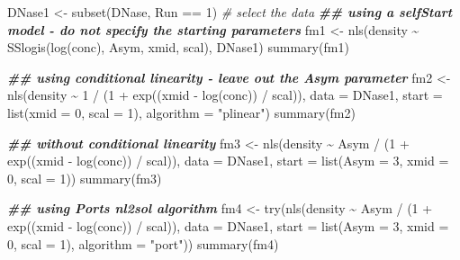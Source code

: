 \documentclass[
]{article}
\newenvironment{Shaded}{\begin{snugshade}}{\end{snugshade}}
\newcommand{\AttributeTok}[1]{\textcolor[rgb]{0.77,0.63,0.00}{#1}}
\newcommand{\CommentTok}[1]{\textcolor[rgb]{0.56,0.35,0.01}{\textit{#1}}}
\newcommand{\DecValTok}[1]{\textcolor[rgb]{0.00,0.00,0.81}{#1}}
\newcommand{\DocumentationTok}[1]{\textcolor[rgb]{0.56,0.35,0.01}{\textbf{\textit{#1}}}}
\newcommand{\FunctionTok}[1]{\textcolor[rgb]{0.00,0.00,0.00}{#1}}
\newcommand{\NormalTok}[1]{#1}
\newcommand{\OtherTok}[1]{\textcolor[rgb]{0.56,0.35,0.01}{#1}}
\newcommand{\SpecialCharTok}[1]{\textcolor[rgb]{0.00,0.00,0.00}{#1}}
\newcommand{\StringTok}[1]{\textcolor[rgb]{0.31,0.60,0.02}{#1}}
\begin{document}
\begin{Shaded}
\begin{Highlighting}[]
\NormalTok{DNase1 }\OtherTok{\textless{}{-}} \FunctionTok{subset}\NormalTok{(DNase, Run }\SpecialCharTok{==} \DecValTok{1}\NormalTok{) }\CommentTok{\# select the data}
\DocumentationTok{\#\# using a selfStart model {-} do not specify the starting parameters}
\NormalTok{fm1 }\OtherTok{\textless{}{-}} \FunctionTok{nls}\NormalTok{(density }\SpecialCharTok{\textasciitilde{}} \FunctionTok{SSlogis}\NormalTok{(}\FunctionTok{log}\NormalTok{(conc), Asym, xmid, scal), DNase1)}
\FunctionTok{summary}\NormalTok{(fm1)}

\DocumentationTok{\#\# using conditional linearity {-} leave out the Asym parameter}
\NormalTok{fm2 }\OtherTok{\textless{}{-}} \FunctionTok{nls}\NormalTok{(density }\SpecialCharTok{\textasciitilde{}} \DecValTok{1} \SpecialCharTok{/}\NormalTok{ (}\DecValTok{1} \SpecialCharTok{+} \FunctionTok{exp}\NormalTok{((xmid }\SpecialCharTok{{-}} \FunctionTok{log}\NormalTok{(conc)) }\SpecialCharTok{/}\NormalTok{ scal)),}
                 \AttributeTok{data =}\NormalTok{ DNase1, }\AttributeTok{start =} \FunctionTok{list}\NormalTok{(}\AttributeTok{xmid =} \DecValTok{0}\NormalTok{, }\AttributeTok{scal =} \DecValTok{1}\NormalTok{),}
                 \AttributeTok{algorithm =} \StringTok{"plinear"}\NormalTok{)}
\FunctionTok{summary}\NormalTok{(fm2)}

\DocumentationTok{\#\# without conditional linearity}
\NormalTok{fm3 }\OtherTok{\textless{}{-}} \FunctionTok{nls}\NormalTok{(density }\SpecialCharTok{\textasciitilde{}}\NormalTok{ Asym }\SpecialCharTok{/}\NormalTok{ (}\DecValTok{1} \SpecialCharTok{+} \FunctionTok{exp}\NormalTok{((xmid }\SpecialCharTok{{-}} \FunctionTok{log}\NormalTok{(conc)) }\SpecialCharTok{/}\NormalTok{ scal)),}
                 \AttributeTok{data =}\NormalTok{ DNase1,}
                 \AttributeTok{start =} \FunctionTok{list}\NormalTok{(}\AttributeTok{Asym =} \DecValTok{3}\NormalTok{, }\AttributeTok{xmid =} \DecValTok{0}\NormalTok{, }\AttributeTok{scal =} \DecValTok{1}\NormalTok{))}
\FunctionTok{summary}\NormalTok{(fm3)}

\DocumentationTok{\#\# using Port\textquotesingle{}s nl2sol algorithm}
\NormalTok{fm4 }\OtherTok{\textless{}{-}} \FunctionTok{try}\NormalTok{(}\FunctionTok{nls}\NormalTok{(density }\SpecialCharTok{\textasciitilde{}}\NormalTok{ Asym }\SpecialCharTok{/}\NormalTok{ (}\DecValTok{1} \SpecialCharTok{+} \FunctionTok{exp}\NormalTok{((xmid }\SpecialCharTok{{-}} \FunctionTok{log}\NormalTok{(conc)) }\SpecialCharTok{/}\NormalTok{ scal)),}
                 \AttributeTok{data =}\NormalTok{ DNase1, }\AttributeTok{start =} \FunctionTok{list}\NormalTok{(}\AttributeTok{Asym =} \DecValTok{3}\NormalTok{, }\AttributeTok{xmid =} \DecValTok{0}\NormalTok{, }\AttributeTok{scal =} \DecValTok{1}\NormalTok{),}
                 \AttributeTok{algorithm =} \StringTok{"port"}\NormalTok{))}
\FunctionTok{summary}\NormalTok{(fm4)}


\end{Highlighting}
\end{Shaded}
\end{document}
